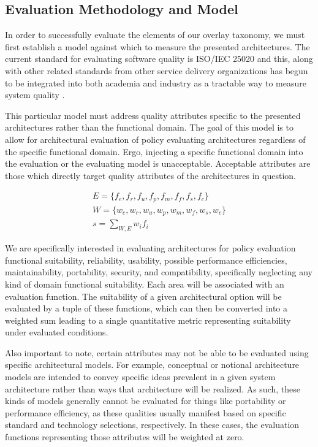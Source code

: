 \subsection{Evaluation Methodology and Model}
In order to successfully evaluate the elements of our overlay taxonomy, we must first establish a model against which to measure the presented architectures.  The current standard for evaluating software quality is ISO/IEC 25020 and this, along with other related standards from other service delivery organizations has begun to be integrated into both academia and industry as a tractable way to measure system quality \cite{5958158, proposal:iso-25020}.

This particular model must address quality attributes specific to the presented architectures rather than the functional domain.  The goal of this model is to allow for architectural evaluation of policy evaluating architectures regardless of the specific functional domain.  Ergo, injecting a specific functional domain into the evaluation or the evaluating model is unacceptable.  Acceptable attributes are those which directly target quality attributes of the architectures in question.

\begin{eqnarray}
E = \lbrace f_{e}, f_{r}, f_{u}, f_{p}, f_{m}, f_{f}, f_{s}, f_{c} \rbrace \\
W= \lbrace w_{e}, w_{r}, w_{u}, w_{p}, w_{m}, w_{f}, w_{s}, w_{c} \rbrace \\
s = \sum_{W, E} w_{i} f_{i}
\end{eqnarray}

We are specifically interested in evaluating architectures for policy evaluation functional suitability, reliability, usability, possible performance efficiencies, maintainability, portability, security, and compatibility, specifically neglecting any kind of domain functional suitability.  Each area will be associated with an evaluation function.  The suitability of a given architectural option will be evaluated by a tuple of these functions, which can then be converted into a weighted sum leading to a single quantitative metric representing suitability under evaluated conditions.

Also important to note, certain attributes may not be able to be evaluated using specific architectural models.  For example, conceptual or notional architecture models are intended to convey specific ideas prevalent in a given system architecture rather than ways that architecture will be realized.  As such, these kinds of models generally cannot be evaluated for things like portability or performance efficiency, as these qualities usually manifest based on specific standard and technology selections, respectively.  In these cases, the evaluation functions representing those attributes will be weighted at zero.

